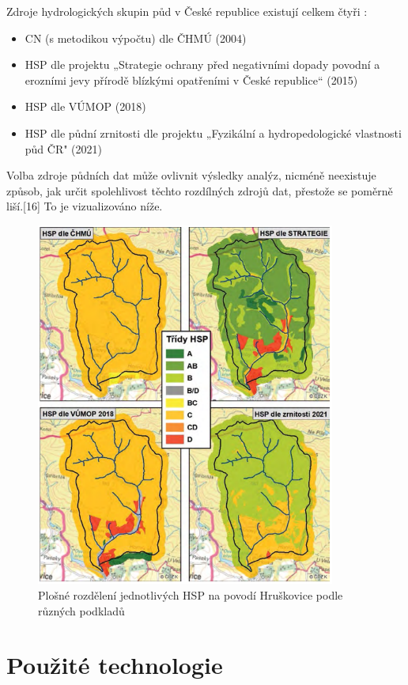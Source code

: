\documentclass[a4paper,oneside,12pt]{book}
\begin{document}
Zdroje hydrologických skupin půd v České republice existují celkem čtyři \cite{Strouhal2022}:
\begin{itemize}
\item CN (s metodikou výpočtu) dle ČHMÚ (2004)
\item HSP dle projektu „Strategie ochrany před negativními dopady povodní a erozními jevy přírodě blízkými opatřeními v České republice“ (2015)
\item HSP dle VÚMOP (2018) 
\item HSP dle půdní zrnitosti dle projektu „Fyzikální a hydropedologické vlastnosti půd ČR" (2021)
\end{itemize}
\hspace{10mm} Volba zdroje půdních dat může ovlivnit výsledky analýz, nicméně neexistuje způsob, jak určit spolehlivost těchto rozdílných zdrojů dat, přestože se poměrně liší.[16] To je vizualizováno níže.

\begin{figure}[ht] \label{obr4}
\centering
\includegraphics[height=12cm]{pictures/HSPmapa.png}
\caption{Plošné rozdělení jednotlivých HSP na povodí Hruškovice podle různých podkladů \cite{Strouhal2022}}
\label{fig:hsp}
\end{figure}

\newpage
\newpage

\chapter{Použité technologie} \label{tehcnologie}
\end{document}
